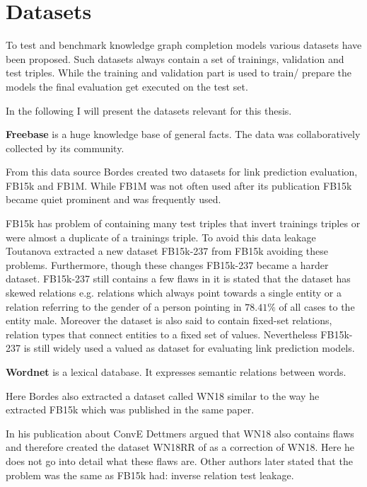 \section{Datasets}
\label{cha:datasets}
To test and benchmark knowledge graph completion models various datasets have been proposed. Such datasets always contain a set of trainings, validation and test triples. While the training and validation part is used to train/ prepare the models the final evaluation get executed on the test set. 

In the following I will present the datasets relevant for this thesis. \hfill \break

\textbf{Freebase} is a huge knowledge base of general facts. The data was collaboratively collected by its community.

From this data source Bordes \cite{bordes_translating_2013} created two datasets for link prediction evaluation, FB15k and FB1M. While FB1M was not often used after its publication FB15k became quiet prominent and was frequently used.  

FB15k has problem of containing many test triples that invert trainings triples or were almost a duplicate of a trainings triple. To avoid this data leakage Toutanova \cite{toutanova_observed_2015} extracted a new dataset FB15k-237 from FB15k avoiding these problems. Furthermore, though these changes FB15k-237 became a harder dataset. FB15k-237 still contains a few flaws in \cite{safavi_codex_2020} it is stated that the dataset has skewed relations e.g. relations which always point towards a single entity or a relation referring to the gender of a person pointing in $78.41\%$ of all cases to the entity male. Moreover the dataset is also said to contain fixed-set relations, relation types that connect entities to a fixed set of values. Nevertheless FB15k-237 is still widely used a valued as dataset for evaluating link prediction models. \hfill \break

\textbf{Wordnet} is a lexical database. It expresses semantic relations between words. 

Here Bordes \cite{bordes_translating_2013} also extracted a dataset called WN18 similar to the way he extracted FB15k which was published in the same paper. 

In his publication about ConvE  Dettmers \cite{dettmers_convolutional_2018} argued that WN18 also contains flaws and therefore created the dataset WN18RR of as a correction of WN18. Here he does not go into detail what these flaws are. Other authors later stated that the problem was the same as FB15k had: inverse relation test leakage. \cite{shang_end--end_2018} \hfill \break

